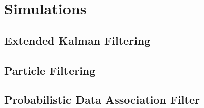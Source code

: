 \chapter{Simulations}

\section{Extended Kalman Filtering}
\section{Particle Filtering}
\section{Probabilistic Data Association Filter}
\section{}

